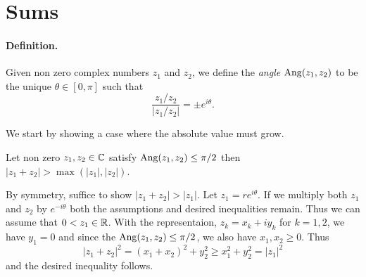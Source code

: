 \section{Sums}

\paragraph{Definition.} 
Given non zero complex numbers \(z_1\) and \(z_2\), 
we define the \emph{angle} \(\mathop{\rm Ang}\nolimits(z_1,z_2)\)
to be the unique \(\theta \in [0,\pi]\) such that
\begin{equation*}
\frac{z_1/ z_2}{|z_1/ z_2|} = \pm e^{i\theta}.
\end{equation*}

We start by showing a case where the absolute value must grow.

\begin{llem} \label{llem:z1z2:grow}
Let non zero \(z_1,z_2\in \mathbb{C}\) satisfy \(\mathop{\rm Ang}\nolimits(z_1,z_2) \leq \pi/2\)
then \(|z_1 + z_2| > \max(|z_1|,|z_2|)\). 
\end{llem}
\begin{thmproof}
By symmetry, suffice to show \(|z_1 + z_2| > |z_1|\).
Let \(z_1 = re^{i\theta}\). If we multiply both \(z_1\) and \(z_2\)
by \(e^{-i\theta}\) both the assumptions and desired inequalities remain.
Thus we can assume that \(0 < z_1 \in\mathbb{R}\).
With the representaion, \(z_k = x_k + iy_k\) for \(k=1,2\),
we have \(y_1 = 0\)
and since the \(\mathop{\rm Ang}\nolimits(z_1,z_2) \leq \pi/2\), 
we also have \(x_1,x_2 \geq 0\).
Thus
\begin{equation*}
|z_1 + z_2|^2 = (x_1 + x_2)^2 + y_2^2 \geq x_1^2 + y_2^2 = |z_1|^2
\end{equation*}
and the desired inequality follows.
\end{thmproof}

